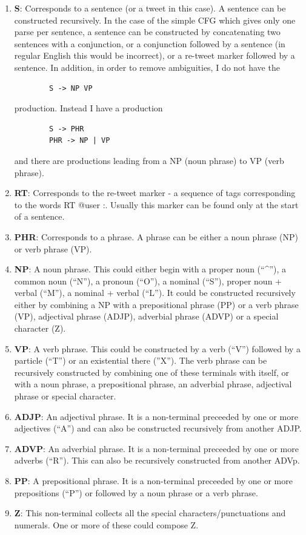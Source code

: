 \documentclass[10pt, letter]{article}
\begin{document}
\begin{enumerate}
	\item \textbf{S}: Corresponds to a sentence (or a tweet in this case). A sentence can be constructed recursively. In the case of the simple CFG which gives only one parse per sentence, a sentence can be constructed by concatenating two sentences with a conjunction, or a conjunction followed by a sentence (in regular English this would be incorrect), or a re-tweet marker followed by a sentence. In addition, in order to remove ambiguities, I do not have the 
	\begin{verbatim}	
		S -> NP VP
	\end{verbatim}
	production. Instead I have a production
	\begin{verbatim}
		S -> PHR
		PHR -> NP | VP
	\end{verbatim}
	and there are productions leading from a NP (noun phrase) to VP (verb phrase).
	\item \textbf{RT}: Corresponds to the re-tweet marker - a sequence of tags corresponding to the words RT @user :. Usually this marker can be found only at the start of a sentence. 
	\item \textbf{PHR}: Corresponds to a phrase. A phrase can be either a noun phrase (NP) or verb phrase (VP).
	\item \textbf{NP}: A noun phrase. This could either begin with a proper noun (``\textasciicircum''), a common noun (``N''), a pronoun (``O''), a nominal (``S''), proper noun + verbal (``M''), a nominal + verbal (``L''). It could be constructed recursively either by combining a NP with a prepositional phrase (PP) or a verb phrase (VP), adjectival phrase (ADJP), adverbial phrase (ADVP) or a special character (Z).
	\item \textbf{VP}: A verb phrase. This could be constructed by a verb (``V'') followed by a particle (``T'') or an existential there (''X''). The verb phrase can be recursively constructed by combining one of these terminals with itself, or with a noun phrase, a prepositional phrase, an adverbial phrase, adjectival phrase or special character.
	\item \textbf{ADJP}: An adjectival phrase. It is a non-terminal preceeded by one or more adjectives (``A'') and can also be constructed recursively from another ADJP.
	\item \textbf{ADVP}: An adverbial phrase. It is a non-terminal preceeded by one or more adverbs (``R''). This can also be recursively constructed from another ADVp.
	\item \textbf{PP}: A prepositional phrase. It is a non-terminal preceeded by one or more prepositions (``P'') or followed by a noun phrase or a verb phrase.
	\item \textbf{Z}: This non-terminal collects all the special characters/punctuations and numerals. One or more of these could compose Z.
\end{enumerate}
\end{document}
